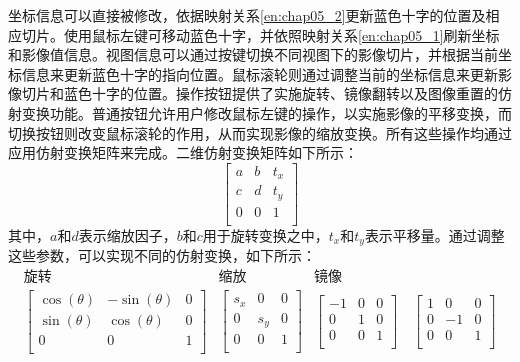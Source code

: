 坐标信息可以直接被修改，依据映射关系\ref{en:chap05_2}更新蓝色十字的位置及相应切片。使用鼠标左键可移动蓝色十字，并依照映射关系\ref{en:chap05_1}刷新坐标和影像值信息。视图信息可以通过按键切换不同视图下的影像切片，并根据当前坐标信息来更新蓝色十字的指向位置。鼠标滚轮则通过调整当前的坐标信息来更新影像切片和蓝色十字的位置。操作按钮提供了实施旋转、镜像翻转以及图像重置的仿射变换功能。普通按钮允许用户修改鼠标左键的操作，以实施影像的平移变换，而切换按钮则改变鼠标滚轮的作用，从而实现影像的缩放变换。所有这些操作均通过应用仿射变换矩阵来完成。二维仿射变换矩阵如下所示：
\begin{equation}
  \left[
    \begin{array}{ccc}
      a & b & t_x \\
      c & d & t_y \\
      0 & 0 & 1   \\
    \end{array}
    \right]
  \label{eq:chap05_affine_mat}
\end{equation}
其中，\(a\)和\(d\)表示缩放因子，\(b\)和\(c\)用于旋转变换之中，\(t_x\)和\(t_y\)表示平移量。通过调整这些参数，可以实现不同的仿射变换，如下所示：
\begin{equation}
  \begin{array}{ccc}
    \text{旋转} & \text{缩放} & \text{镜像} \\
    \left[
      \begin{array}{ccc}
        \cos(\theta) & -\sin(\theta) & 0 \\
        \sin(\theta) & \cos(\theta)  & 0 \\
        0            & 0             & 1 \\
      \end{array}
    \right]     &
    \left[
      \begin{array}{ccc}
        s_x & 0   & 0 \\
        0   & s_y & 0 \\
        0   & 0   & 1 \\
      \end{array}
    \right]     &
    \left[
      \begin{array}{ccc}
        -1 & 0 & 0 \\
        0  & 1 & 0 \\
        0  & 0 & 1 \\
      \end{array}
      \right] \quad
    \left[
      \begin{array}{ccc}
        1 & 0  & 0 \\
        0 & -1 & 0 \\
        0 & 0  & 1 \\
      \end{array}
    \right]                                 \\
  \end{array}
  \label{eq:chap05_affine}
\end{equation}
